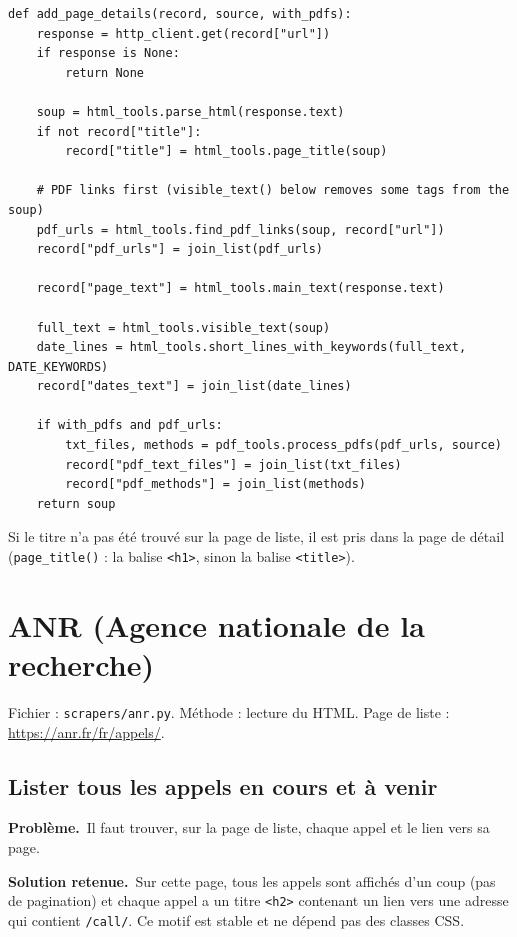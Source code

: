 \documentclass[11pt,a4paper]{article}
\newcommand{\pb}{\par\medskip\noindent\textbf{\textcolor{pbcolor}{Problème.}}\ }
\newcommand{\sol}{\par\medskip\noindent\textbf{\textcolor{solcolor}{Solution retenue.}}\ }
\newcommand{\code}[1]{\texttt{#1}}
\begin{document}
\begin{lstlisting}
def add_page_details(record, source, with_pdfs):
    response = http_client.get(record["url"])
    if response is None:
        return None

    soup = html_tools.parse_html(response.text)
    if not record["title"]:
        record["title"] = html_tools.page_title(soup)

    # PDF links first (visible_text() below removes some tags from the soup)
    pdf_urls = html_tools.find_pdf_links(soup, record["url"])
    record["pdf_urls"] = join_list(pdf_urls)

    record["page_text"] = html_tools.main_text(response.text)

    full_text = html_tools.visible_text(soup)
    date_lines = html_tools.short_lines_with_keywords(full_text, DATE_KEYWORDS)
    record["dates_text"] = join_list(date_lines)

    if with_pdfs and pdf_urls:
        txt_files, methods = pdf_tools.process_pdfs(pdf_urls, source)
        record["pdf_text_files"] = join_list(txt_files)
        record["pdf_methods"] = join_list(methods)
    return soup
\end{lstlisting}

Si le titre n'a pas été trouvé sur la page de liste, il est pris dans la page de détail
(\code{page\_title()} : la balise \code{<h1>}, sinon la balise \code{<title>}).

\section{ANR (Agence nationale de la recherche)}
\label{sec:anr}

Fichier : \code{scrapers/anr.py}. Méthode : lecture du HTML. Page de liste :
\url{https://anr.fr/fr/appels/}.

\subsection{Lister tous les appels en cours et à venir}

\pb Il faut trouver, sur la page de liste, chaque appel et le lien vers sa page.

\sol Sur cette page, tous les appels sont affichés d'un coup (pas de pagination) et chaque
appel a un titre \code{<h2>} contenant un lien vers une adresse qui contient
\code{/call/}. Ce motif est stable et ne dépend pas des classes CSS.
\end{document}
